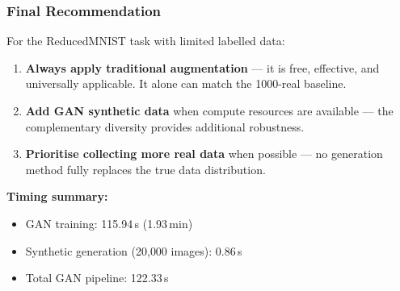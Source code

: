 \documentclass[12pt, a4paper]{article}
\begin{document}
\subsubsection{Final Recommendation}

For the ReducedMNIST task with limited labelled data:
\begin{enumerate}
    \item \textbf{Always apply traditional augmentation} --- it is free, effective, and
          universally applicable. It alone can match the 1000-real baseline.
    \item \textbf{Add GAN synthetic data} when compute resources are available ---
          the complementary diversity provides additional robustness.
    \item \textbf{Prioritise collecting more real data} when possible --- no generation
          method fully replaces the true data distribution.
\end{enumerate}

\textbf{Timing summary:}
\begin{itemize}
    \item GAN training: 115.94\,s (1.93\,min)
    \item Synthetic generation (20{,}000 images): 0.86\,s
    \item Total GAN pipeline: 122.33\,s
\end{itemize}
\end{document}
